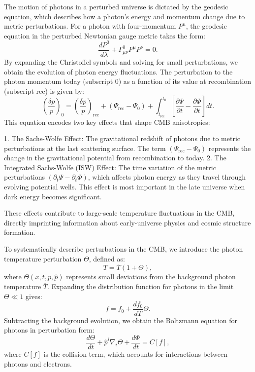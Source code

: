 \documentclass{aa}
\begin{document}
The motion of photons in a perturbed universe is dictated by the geodesic equation, which describes how a photon's energy and momentum change due to metric perturbations. For a photon with four-momentum $P^\mu$, the geodesic equation in the perturbed Newtonian gauge metric takes the form:
\begin{equation}
\frac{dP^0}{d\lambda} + \Gamma^0_{\mu\nu} P^\mu P^\nu = 0.
\end{equation}
By expanding the Christoffel symbols and solving for small perturbations, we obtain the evolution of photon energy fluctuations. The perturbation to the photon momentum today (subscript 0) as a function of its value at recombination (subscript rec) is given by:
\begin{equation}
\left(\frac{\delta p}{p}\right)_0 = \left(\frac{\delta p}{p}\right)_{\text{rec}} + \left(\Psi_{\text{rec}} - \Psi_0\right) + \int_{t_{\text{rec}}}^{t_0} \left[\frac{\partial\Psi}{\partial t} - \frac{\partial \Phi}{\partial t} \right] dt.
\end{equation}
This equation encodes two key effects that shape CMB anisotropies:

1. The Sachs-Wolfe Effect: The gravitational redshift of photons due to metric perturbations at the last scattering surface. The term $(\Psi_{\text{rec}} - \Psi_0)$ represents the change in the gravitational potential from recombination to today.
2. The Integrated Sachs-Wolfe (ISW) Effect: The time variation of the metric perturbations $(\partial_t \Psi - \partial_t \Phi)$, which affects photon energy as they travel through evolving potential wells. This effect is most important in the late universe when dark energy becomes significant.

These effects contribute to large-scale temperature fluctuations in the CMB, directly imprinting information about early-universe physics and cosmic structure formation.

To systematically describe perturbations in the CMB, we introduce the photon temperature perturbation $\Theta$, defined as:
\begin{equation}
T = \overline{T} (1 + \Theta),
\end{equation}
where $\Theta(x, t, p, \hat{p})$ represents small deviations from the background photon temperature $\overline{T}$. Expanding the distribution function for photons in the limit $\Theta \ll 1$ gives:
\begin{equation}
f = f_0 + \frac{df_0}{dT} \Theta.
\end{equation}
Subtracting the background evolution, we obtain the Boltzmann equation for photons in perturbation form:
\begin{equation}
\frac{d\Theta}{dt} + \hat{p}^i \nabla_i \Theta + \frac{d\Phi}{dt} = C[f],
\end{equation}
where $C[f]$ is the collision term, which accounts for interactions between photons and electrons.
\end{document}

